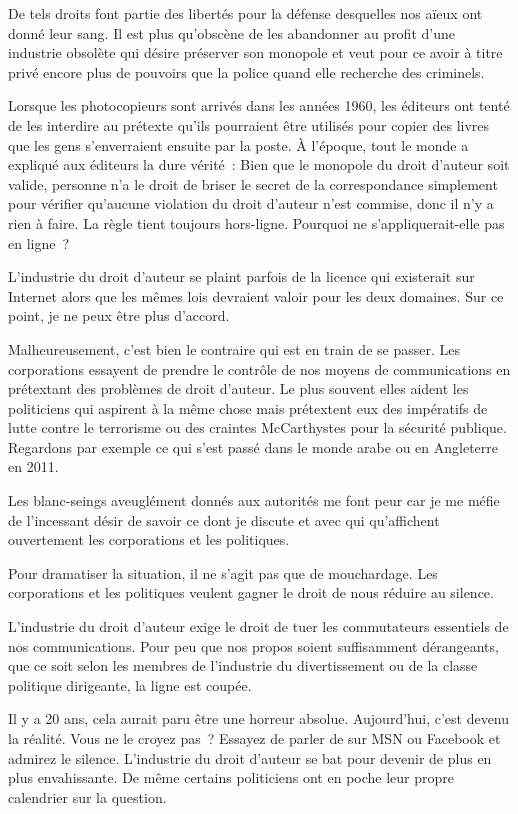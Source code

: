 De tels droits font partie des libertés pour la défense desquelles nos aïeux ont donné leur sang.
Il est plus qu’obscène de les abandonner au profit d’une industrie obsolète qui désire préserver son
monopole et veut pour ce avoir à titre privé encore plus de pouvoirs que la police quand elle
recherche des criminels.

Lorsque les photocopieurs sont arrivés dans les années 1960, les éditeurs ont tenté de les interdire
au prétexte qu’ils pourraient être utilisés pour copier des livres que les gens s’enverraient
ensuite par la poste. À l’époque, tout le monde a expliqué aux éditeurs la dure vérité~: Bien que le
monopole du droit d’auteur soit valide, personne n’a le droit de briser le secret de la
correspondance simplement pour vérifier qu’aucune violation du droit d’auteur n’est commise, donc il
n’y a rien à faire. La règle tient toujours hors-ligne. Pourquoi ne s’appliquerait-elle pas en
ligne~?

L’industrie du droit d’auteur se plaint parfois de la licence qui existerait sur Internet alors que
les mêmes lois devraient valoir pour les deux domaines. Sur ce point, je ne peux être plus d'accord.

Malheureusement, c’est bien le contraire qui est en train de se passer. Les corporations essayent de
prendre le contrôle de nos moyens de communications en prétextant des problèmes de droit d’auteur.
Le plus souvent elles aident les politiciens qui aspirent à la même chose mais prétextent eux des
impératifs de lutte contre le terrorisme ou des craintes McCarthystes pour la sécurité publique.
Regardons par exemple ce qui s’est passé dans le monde arabe ou en Angleterre en 2011.

Les blanc-seings aveuglément donnés aux autorités me font peur car je me
méfie de l’incessant désir de savoir ce dont je discute et avec qui qu'affichent ouvertement les corporations et les politiques.

Pour dramatiser la situation, il ne s’agit pas que de mouchardage. Les corporations et les
politiques veulent gagner le droit de nous réduire au silence.

L’industrie du droit d’auteur exige le droit de tuer les commutateurs essentiels de nos
communications. Pour peu que nos propos soient suffisamment dérangeants, que ce soit selon les
membres de l’industrie du divertissement ou de la classe politique dirigeante, la ligne est coupée.

Il y a 20 ans, cela aurait paru être une horreur absolue. Aujourd’hui, c’est devenu la réalité. Vous
ne le croyez pas~? Essayez de parler de  sur MSN ou Facebook et admirez le silence.
L’industrie du droit d’auteur se bat pour devenir de plus en plus envahissante. De même certains
politiciens ont en poche leur propre calendrier sur la question.

